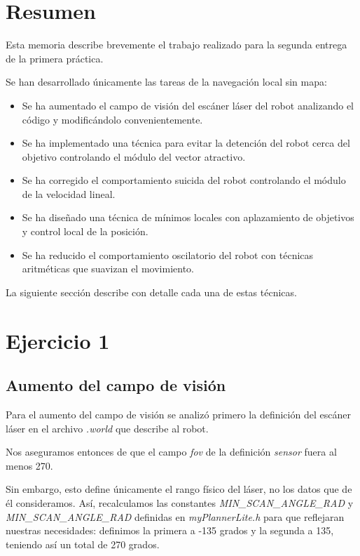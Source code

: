 \documentclass[a4paper, 11pt, titlepage]{article}
\begin{document}
  \maketitle
  \tableofcontents
  \newpage

  \section{Resumen}
  Esta memoria describe brevemente el trabajo realizado para la segunda entrega de la primera práctica.

  Se han desarrollado únicamente las tareas de la navegación local sin mapa:
  \begin{itemize}
      \item Se ha aumentado el campo de visión del escáner láser del robot analizando el código y modificándolo convenientemente.
      \item Se ha implementado una técnica para evitar la detención del robot cerca del objetivo controlando el módulo del vector atractivo.
      \item Se ha corregido el comportamiento suicida del robot controlando el módulo de la velocidad lineal.
      \item Se ha diseñado una técnica de mínimos locales con aplazamiento de objetivos y control local de la posición.
      \item Se ha reducido el comportamiento oscilatorio del robot con técnicas aritméticas que suavizan el movimiento.
  \end{itemize}

  La siguiente sección describe con detalle cada una de estas técnicas.

  \section{Ejercicio 1}

  \subsection{Aumento del campo de visión}
  Para el aumento del campo de visión se analizó primero la definición del escáner láser en el archivo \emph{.world} que describe al robot.

  Nos aseguramos entonces de que el campo \emph{fov} de la definición \emph{sensor} fuera al menos 270.

  Sin embargo, esto define únicamente el rango físico del láser, no los datos que de él consideramos. Así, recalculamos las constantes \emph{MIN\_SCAN\_ANGLE\_RAD} y \emph{MIN\_SCAN\_ANGLE\_RAD} definidas en \emph{myPlannerLite.h} para que reflejaran nuestras necesidades: definimos la primera  a -135 grados y la segunda a 135, teniendo así un total de 270 grados.
\end{document}
